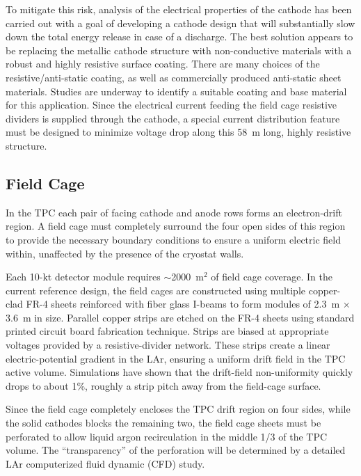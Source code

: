 To mitigate this risk, analysis of the electrical properties of the
cathode has been carried out with a goal of developing a cathode
design that will substantially slow down the total energy release in
case of a discharge.  The best solution appears to be replacing the
metallic cathode structure with non-conductive materials with a robust
and highly resistive surface coating.  There are many choices of the
resistive/anti-static coating, as well as commercially produced
anti-static sheet materials.  Studies are underway to identify a
suitable coating and base material for this application.  Since the
electrical current feeding the field cage resistive dividers is
supplied through the cathode, a special current distribution feature
must be designed to minimize voltage drop along this 58~m long, highly
resistive structure.


\subsection{Field Cage}
\label{subsec:fd-ref-fieldcage}

In the TPC each pair of facing cathode and anode rows forms an
electron-drift region. A field cage must completely surround the four
open sides of this region to provide the necessary boundary conditions
to ensure a uniform electric field within, unaffected by the presence
of the cryostat walls.


Each 10-kt detector module requires $\sim$2000~m$^2$ of field
cage coverage. In the current reference design, the field cages are
constructed using multiple copper-clad FR-4 sheets reinforced with
fiber glass I-beams to form modules of 2.3~m $\times$ 3.6~m in
size. Parallel copper strips are etched on the FR-4 sheets using
standard printed circuit board fabrication technique. Strips are
biased at appropriate voltages provided by a resistive-divider
network. These strips create a linear electric-potential gradient in
the LAr, ensuring a uniform drift field in the TPC active volume.
Simulations have shown that the drift-field non-uniformity quickly
drops to about 1\%, roughly a strip pitch away from the field-cage
surface.

Since the field cage completely encloses the TPC drift region on four
sides, while the solid cathodes blocks the remaining two, the field
cage sheets must be perforated to allow liquid argon recirculation in
the middle 1/3 of the TPC volume. The ``transparency'' of the
perforation will be determined by a detailed LAr computerized fluid
dynamic (CFD) study.

